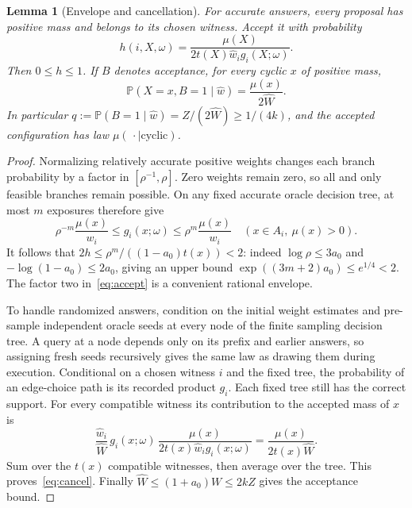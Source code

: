 \documentclass[11pt]{article}
\newtheorem{lemma}[theorem]{Lemma}
\newcommand{\Prb}{\mathbb{P}}
\begin{document}
\begin{lemma}[Envelope and cancellation]\label{lem:cancel}
For accurate answers, every proposal has positive mass and belongs to its
chosen witness. Accept it with probability
\begin{equation}\label{eq:accept}
 h(i,X,\omega)=\frac{\mu(X)}{2t(X)\widehat w_i g_i(X;\omega)}.
\end{equation}
Then $0\leq h\leq1$. If $B$ denotes acceptance, for every cyclic $x$ of
positive mass,
\begin{equation}\label{eq:cancel}
 \Prb(X=x,B=1\mid\widehat w)=\frac{\mu(x)}{2\widehat W}.
\end{equation}
In particular $q:=\Prb(B=1\mid\widehat w)=Z/(2\widehat W)\geq1/(4k)$,
and the accepted configuration has law $\mu(\,\cdot\mid\text{cyclic})$.
\end{lemma}
\begin{proof}
Normalizing relatively accurate positive weights changes each branch
probability by a factor in $[\rho^{-1},\rho]$. Zero weights remain zero,
so all and only feasible branches remain possible. On any fixed accurate
oracle decision tree, at most $m$ exposures therefore give
\[
 \rho^{-m}\frac{\mu(x)}{w_i}
 \leq g_i(x;\omega)\leq\rho^m\frac{\mu(x)}{w_i}\quad(x\in A_i,\ \mu(x)>0).
\]
It follows that $2h\leq\rho^m/((1-a_0)t(x))<2$:
indeed $\log\rho\leq3a_0$ and $-\log(1-a_0)\leq2a_0$, giving an upper
bound $\exp((3m+2)a_0)\leq e^{1/4}<2$.
The factor two in~\eqref{eq:accept} is a convenient rational envelope.

To handle randomized answers, condition on the initial weight estimates
and pre-sample independent oracle seeds at every node of the finite
sampling decision tree. A query at a node depends only on its prefix and
earlier answers, so assigning fresh seeds recursively gives the same law
as drawing them during execution. Conditional on a chosen witness $i$ and
the fixed tree, the probability of an edge-choice path is its recorded
product $g_i$. Each fixed tree still has the correct support.
For every compatible witness its contribution to the accepted mass of $x$ is
\[
 \frac{\widehat w_i}{\widehat W}\,g_i(x;\omega)\,
 \frac{\mu(x)}{2t(x)\widehat w_i g_i(x;\omega)}
 =\frac{\mu(x)}{2t(x)\widehat W}.
\]
Sum over the $t(x)$ compatible witnesses, then average over the tree.
This proves~\eqref{eq:cancel}. Finally
$\widehat W\leq(1+a_0)W\leq2kZ$ gives the acceptance bound.
\end{proof}
\end{document}
